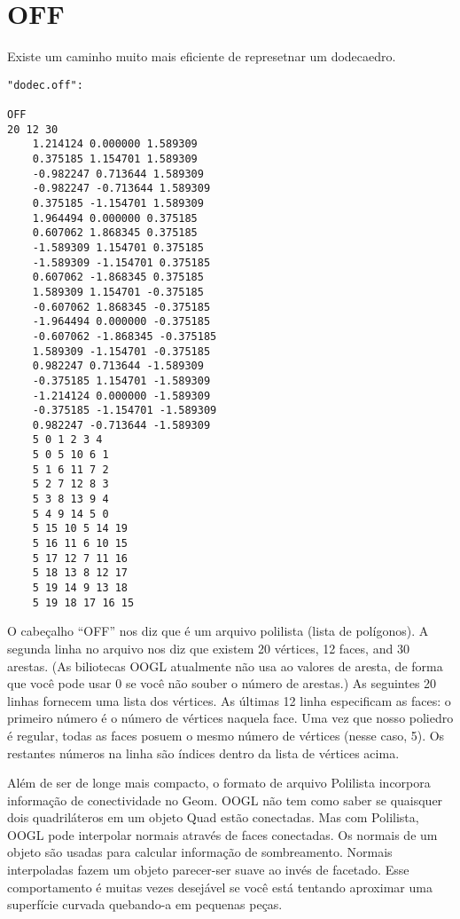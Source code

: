 \documentclass[12pt,a4paper]{book}
\begin{document}
\chapter{OFF}

Existe um caminho muito mais eficiente de represetnar um dodecaedro.

\begin{verbatim}
"dodec.off":

OFF
20 12 30
	1.214124 0.000000 1.589309
	0.375185 1.154701 1.589309
	-0.982247 0.713644 1.589309
	-0.982247 -0.713644 1.589309
	0.375185 -1.154701 1.589309
	1.964494 0.000000 0.375185
	0.607062 1.868345 0.375185
	-1.589309 1.154701 0.375185
	-1.589309 -1.154701 0.375185
	0.607062 -1.868345 0.375185
	1.589309 1.154701 -0.375185
	-0.607062 1.868345 -0.375185
	-1.964494 0.000000 -0.375185
	-0.607062 -1.868345 -0.375185
	1.589309 -1.154701 -0.375185
	0.982247 0.713644 -1.589309
	-0.375185 1.154701 -1.589309
	-1.214124 0.000000 -1.589309
	-0.375185 -1.154701 -1.589309
	0.982247 -0.713644 -1.589309
	5 0 1 2 3 4
	5 0 5 10 6 1
	5 1 6 11 7 2
	5 2 7 12 8 3
	5 3 8 13 9 4
	5 4 9 14 5 0
	5 15 10 5 14 19
	5 16 11 6 10 15
	5 17 12 7 11 16
	5 18 13 8 12 17
	5 19 14 9 13 18
	5 19 18 17 16 15
\end{verbatim}

O cabeçalho ``OFF'' nos diz que é um arquivo polilista (lista de polígonos). A segunda linha no
arquivo nos diz que existem 20 vértices, 12 faces, and 30 arestas.
(As biliotecas OOGL atualmente não usa ao valores de aresta, de forma que você pode
usar 0 se você não souber o número de arestas.)  As seguintes 20
linhas fornecem uma lista dos vértices. As últimas 12 linha especificam as faces:
o primeiro número é o número de vértices naquela face. Uma vez que nosso
poliedro é regular, todas as faces posuem o mesmo número de
vértices (nesse caso, 5).  Os restantes números na linha são
índices dentro da lista de vértices acima.

Além de ser de longe mais compacto, o formato de arquivo Polilista incorpora
informação de conectividade no Geom.  OOGL não tem como saber
se quaisquer dois quadriláteros em um objeto Quad estão conectadas.  Mas
com Polilista, OOGL pode interpolar normais através de faces conectadas.
Os normais de um objeto são usadas para calcular informação de sombreamento.
Normais interpoladas fazem um objeto parecer-ser suave ao invés de facetado.
Esse comportamento é muitas vezes desejável se você está tentando aproximar uma superfície
curvada quebando-a em pequenas peças.
\end{document}

